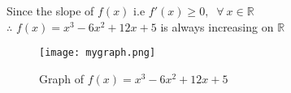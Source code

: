 \documentclass[journal,12pt,twocolumn]{IEEEtran}
\begin{document}
  Since the slope of $f(x)$ i.e $f'(x)\ge0, \;\;\forall ~x \in \mathbb{R}$      \\ 
	$\therefore$\; $f(x)=x^3-6x^2+12x+5$ is always increasing on $\mathbb{R}$
	
	
	\begin{figure}[!ht]
		\centering
		\texttt{[image: mygraph.png]}
		\caption{Graph of $f(x) = x^3-6x^2+12x+5$ }
		\label{fig-1}
	\end{figure}
	
\end{document}
